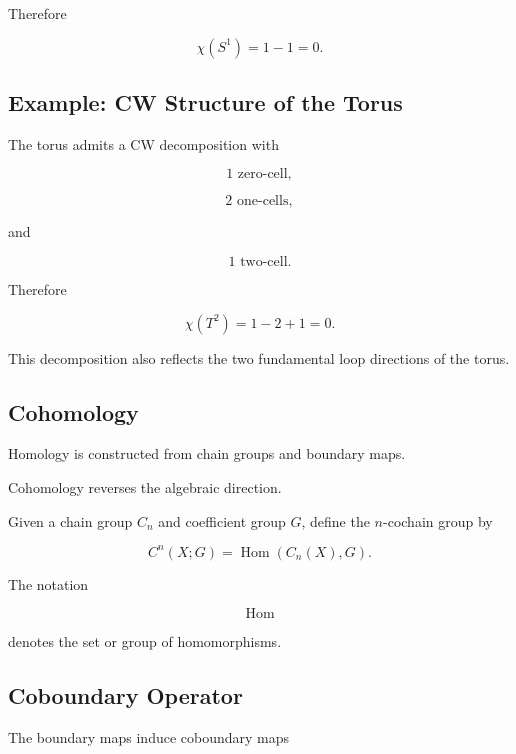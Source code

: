 Therefore

\[
\chi(S^1)
=
1-1
=
0.
\]

\subsection{Example: CW Structure of the Torus}
\label{subsec:cw-torus}

The torus admits a CW decomposition with

\[
\boxed{
1\text{ zero-cell},
}
\]

\[
\boxed{
2\text{ one-cells},
}
\]

and

\[
\boxed{
1\text{ two-cell}.
}
\]

Therefore

\[
\boxed{
\chi(T^2)
=
1-2+1
=
0.
}
\]

This decomposition also reflects the two fundamental loop directions of the
torus.

\subsection{Cohomology}
\label{subsec:cohomology-introduction}

Homology is constructed from chain groups and boundary maps.

Cohomology reverses the algebraic direction.

Given a chain group \(C_n\) and coefficient group \(G\), define the
\(n\)-cochain group by

\[
\boxed{
C^n(X;G)
=
\operatorname{Hom}(C_n(X),G).
}
\]

The notation

\[
\operatorname{Hom}
\]

denotes the set or group of homomorphisms.

\subsection{Coboundary Operator}
\label{subsec:coboundary-operator}

The boundary maps induce coboundary maps


